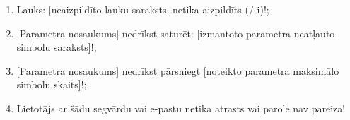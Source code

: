 {
	\begin{enumerate}
		\item Lauks: [neaizpildīto lauku saraksts] netika aizpildīts (/-i)!;
		\item {}[Parametra nosaukums] nedrīkst saturēt: [izmantoto parametra neatļauto simbolu saraksts]!;
		\item {}[Parametra nosaukums] nedrīkst pārsniegt [noteikto parametra maksimālo simbolu skaits]!;
		\item Lietotājs ar šādu segvārdu vai e-pastu netika atrasts vai parole nav pareiza!
	\end{enumerate}
}
